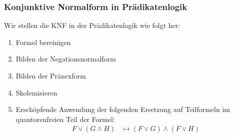 \documentclass[onlymath]{beamer}
\begin{document}
\begin{frame}\frametitle{Konjunktive Normalform in Prädikatenlogik}

\medskip

Wir stellen die KNF in der Prädikatenlogik wie folgt her:
\begin{enumerate}[(1)]
\item Formel bereinigen
\item Bilden der Negationsnormalform
\item Bilden der Pränexform
\item Skolemisieren
\item Erschöpfende Anwendung der folgenden Ersetzung auf Teilformeln im quantorenfreien Teil der Formel:
\begin{align*}
F\vee(G\wedge H) &\mapsto (F\vee G)\wedge (F\vee H)
\end{align*}
\end{enumerate}
\end{frame}
\end{document}
